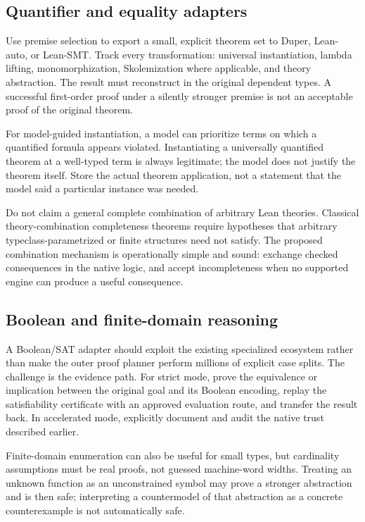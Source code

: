 \documentclass[11pt,letterpaper]{article}
\newcommand{\Lean}{\textsf{Lean}}
\theoremstyle{definition}
\theoremstyle{remark}
\begin{document}
\subsection{Quantifier and equality adapters}
Use premise selection to export a small, explicit theorem set to Duper, Lean-auto, or Lean-SMT. Track every transformation: universal instantiation, lambda lifting, monomorphization, Skolemization where applicable, and theory abstraction. The result must reconstruct in the original dependent types. A successful first-order proof under a silently stronger premise is not an acceptable proof of the original theorem.

For model-guided instantiation, a model can prioritize terms on which a quantified formula appears violated. Instantiating a universally quantified theorem at a well-typed term is always legitimate; the model does not justify the theorem itself. Store the actual theorem application, not a statement that the model said a particular instance was needed.

Do not claim a general complete combination of arbitrary \Lean{} theories. Classical theory-combination completeness theorems require hypotheses that arbitrary typeclass-parametrized or finite structures need not satisfy. The proposed combination mechanism is operationally simple and sound: exchange checked consequences in the native logic, and accept incompleteness when no supported engine can produce a useful consequence.

\subsection{Boolean and finite-domain reasoning}
A Boolean/SAT adapter should exploit the existing specialized ecosystem rather than make the outer proof planner perform millions of explicit case splits. The challenge is the evidence path. For strict mode, prove the equivalence or implication between the original goal and its Boolean encoding, replay the satisfiability certificate with an approved evaluation route, and transfer the result back. In accelerated mode, explicitly document and audit the native trust described earlier.

Finite-domain enumeration can also be useful for small types, but cardinality assumptions must be real proofs, not guessed machine-word widths. Treating an unknown function as an unconstrained symbol may prove a stronger abstraction and is then safe; interpreting a countermodel of that abstraction as a concrete counterexample is not automatically safe.
\end{document}
